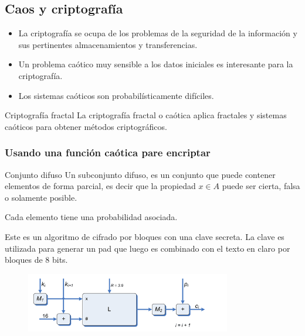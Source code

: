 \documentclass[8pt]{beamer}
\begin{document}
\subsection{Caos y criptografía}

\begin{frame}
\begin{itemize}
\item La criptografía se ocupa de los problemas de la seguridad de la información y sus pertinentes almacenamientos y transferencias.
\item Un problema caótico muy sensible a los datos iniciales es interesante para la criptografía.
\item Los sistemas caóticos son probabilísticamente difíciles.
\end{itemize}

\begin{block}{Criptografía fractal}
La criptografía fractal o caótica aplica fractales y sistemas caóticos para obtener métodos criptográficos.
\end{block}
\end{frame}

\subsubsection{Usando una función caótica pare encriptar}

\begin{frame}

\begin{block}{Conjunto difuso}
Un subconjunto difuso, es un conjunto que puede contener elementos de forma parcial, es decir que la propiedad  $x\in A$ puede ser cierta, falsa o solamente posible.

Cada elemento tiene una probabilidad asociada.
\end{block}

\begin{example}
Este es un algoritmo de cifrado por bloques con una clave secreta. La clave es utilizada para generar un pad que luego es combinado con el texto en claro por bloques de 8 bits.

\begin{figure}[hbpt]
\centering
\includegraphics[width = 0.8\textwidth]{img/cifradoCaotico.png}
\end{figure}
\end{example}
\end{frame}
\end{document}

